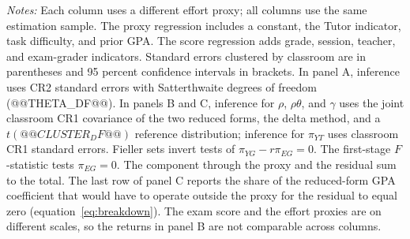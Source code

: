 \begin{table}[htbp]
\centering
\begingroup
{}
\small
\setlength{\tabcolsep}{5pt}
\caption{Safeguards, Student Dialogue, and the Unassisted Exam Score}
\label{tab:main}
\par\medskip
\begin{minipage}{\linewidth}
\footnotesize
\textit{Notes:} Each column uses a different effort proxy; all columns use the same estimation sample. The proxy regression includes a constant, the Tutor indicator, task difficulty, and prior GPA. The score regression adds grade, session, teacher, and exam-grader indicators. Standard errors clustered by classroom are in parentheses and 95 percent confidence intervals in brackets. In panel A, inference uses CR2 standard errors with Satterthwaite degrees of freedom (@@THETA_DF@@). In panels B and C, inference for $\rho$, $\rho\theta$, and $\gamma$ uses the joint classroom CR1 covariance of the two reduced forms, the delta method, and a $t(@@CLUSTER_DF@@)$ reference distribution; inference for $\pi_{YT}$ uses classroom CR1 standard errors. Fieller sets invert tests of $\pi_{YG}-r\pi_{EG}=0$. The first-stage $F$-statistic tests $\pi_{EG}=0$. The component through the proxy and the residual sum to the total. The last row of panel C reports the share of the reduced-form GPA coefficient that would have to operate outside the proxy for the residual to equal zero (equation~\ref{eq:breakdown}). The exam score and the effort proxies are on different scales, so the returns in panel B are not comparable across columns.
\end{minipage}
\endgroup
\end{table}
